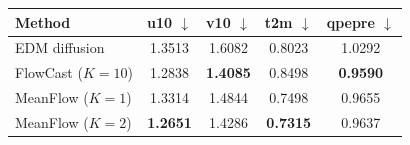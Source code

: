 \documentclass[border=10pt]{standalone}
\begin{document}
\begin{tabular}{lcccc}
\toprule
Method & u10 $\downarrow$ & v10 $\downarrow$ & t2m $\downarrow$ & qpepre $\downarrow$ \\
\midrule
EDM diffusion & 1.3513 & 1.6082 & 0.8023 & 1.0292 \\
FlowCast ($K{=}10$) & 1.2838 & \textbf{1.4085} & 0.8498 & \textbf{0.9590} \\
MeanFlow ($K{=}1$) & 1.3314 & 1.4844 & 0.7498 & 0.9655 \\
MeanFlow ($K{=}2$) & \textbf{1.2651} & 1.4286 & \textbf{0.7315} & 0.9637 \\
\bottomrule
\end{tabular}
\end{document}
